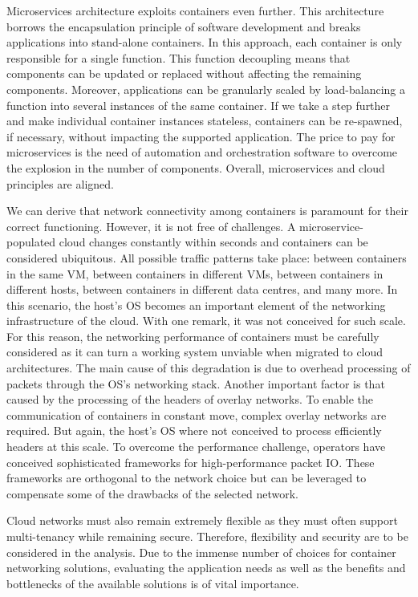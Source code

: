 \documentclass[conference]{IEEEtran}
\begin{document}
Microservices architecture exploits containers even further. This architecture borrows the encapsulation principle of software development and breaks applications into stand-alone containers. In this approach, each container is only responsible for a single function. This function decoupling means that components can be updated or replaced without affecting the remaining components. Moreover, applications can be granularly scaled by load-balancing a function into several instances of the same container. If we take a step further and make individual container instances stateless, containers can be re-spawned, if necessary, without impacting the supported application. The price to pay for microservices is the need of automation and orchestration software to overcome the explosion in the number of components. Overall, microservices and cloud principles are aligned.

We can derive that network connectivity among containers is paramount for their correct functioning.  However, it is not free of challenges. A microservice-populated cloud changes constantly within seconds and containers can be considered ubiquitous. All possible traffic patterns take place: between containers in the same VM, between containers in different VMs, between containers in different hosts, between containers in different data centres, and many more. In this scenario, the host's OS becomes an important element of the networking infrastructure of the cloud. With one remark, it was not conceived for such scale. For this reason, the networking performance of containers must be carefully considered as it can turn a working system unviable when migrated to cloud architectures. The main cause of this degradation is due to overhead processing of packets through the OS's networking stack. Another important factor is that caused by the processing of the headers of overlay networks. To enable the communication of containers in constant move, complex overlay networks are required. But again, the host's OS where not conceived to process efficiently headers at this scale. To overcome the performance challenge, operators have conceived sophisticated frameworks for high-performance packet IO. These frameworks are orthogonal to the network choice but can be leveraged to compensate some of the drawbacks of the selected network.

Cloud networks must also remain extremely flexible as they must often support multi-tenancy while remaining secure. Therefore, flexibility and security are to be considered in the analysis. Due to the immense number of choices for container networking solutions, evaluating the application needs as well as the benefits and bottlenecks of the available solutions is of vital importance.
\end{document}
